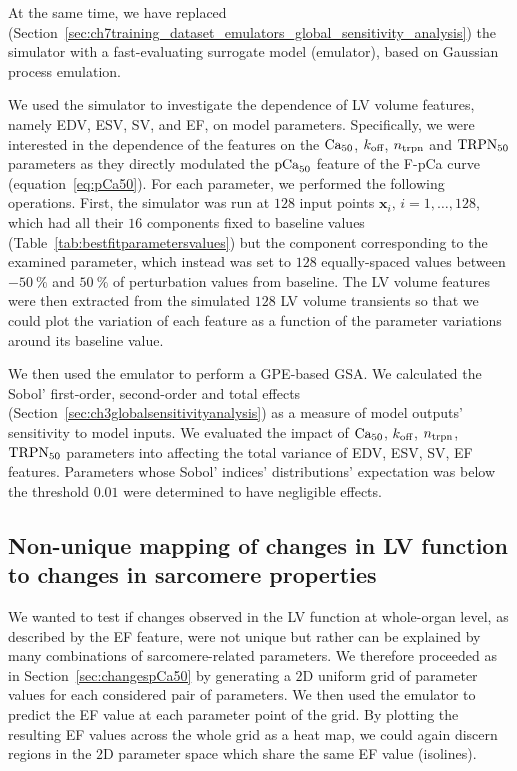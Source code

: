 \vspace{0.2cm}\noindent
At the same time, we have replaced (Section~\ref{sec:ch7training_dataset_emulators_global_sensitivity_analysis}) the simulator with a fast-evaluating surrogate model (emulator), based on Gaussian process emulation.

\vspace{0.2cm}
We used the simulator to investigate the dependence of LV volume features, namely EDV, ESV, SV, and EF, on model parameters. Specifically, we were interested in the dependence of the features on the $\textrm{Ca}_{50}$, $k_{\textrm{off}}$, $n_{\textrm{trpn}}$ and $\textrm{TRPN}_{50}$ parameters as they directly modulated the $\textrm{pCa}_{50}$ feature of the F-pCa curve (equation~\eqref{eq:pCa50}). For each parameter, we performed the following operations. First, the simulator was run at $128$ input points $\mathbf{x}_i,\,i=1,\dots,128$, which had all their $16$ components fixed to baseline values (Table~\ref{tab:bestfitparametersvalues}) but the component corresponding to the examined parameter, which instead was set to $128$ equally-spaced values between $-\SI{50}{\percent}$ and $\SI{50}{\percent}$ of perturbation values from baseline. The LV volume features were then extracted from the simulated $128$ LV volume transients so that we could plot the variation of each feature as a function of the parameter variations around its baseline value.

\vspace{0.2cm}
We then used the emulator to perform a GPE-based GSA. We calculated the Sobol' first-order, second-order and total effects (Section~\ref{sec:ch3globalsensitivityanalysis}) as a measure of model outputs' sensitivity to model inputs. We evaluated the impact of $\textrm{Ca}_{50}$, $k_{\textrm{off}}$, $n_{\textrm{trpn}}$, $\textrm{TRPN}_{50}$ parameters into affecting the total variance of EDV, ESV, SV, EF features. Parameters whose Sobol' indices' distributions' expectation was below the threshold $0.01$ were determined to have negligible effects.


%
%
%
\subsection{Non-unique mapping of changes in LV function to changes in sarcomere properties}\label{sec:changesLVfunction}
We wanted to test if changes observed in the LV function at whole-organ level, as described by the EF feature, were not unique but rather can be explained by many combinations of sarcomere-related parameters. We therefore proceeded as in Section~\ref{sec:changespCa50} by generating a $2$D uniform grid of parameter values for each considered pair of parameters. We then used the emulator to predict the EF value at each parameter point of the grid. By plotting the resulting EF values across the whole grid as a heat map, we could again discern regions in the $2$D parameter space which share the same EF value (isolines).


